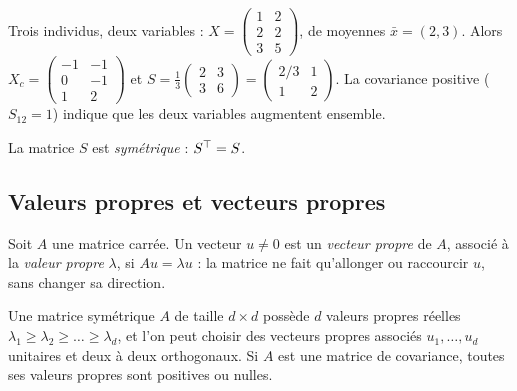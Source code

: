 \begin{exemple}
Trois individus, deux variables : $X=\begin{pmatrix}1&2\\2&2\\3&5\end{pmatrix}$, de moyennes $\bar x=(2,3)$.
Alors $X_c=\begin{pmatrix}-1&-1\\0&-1\\1&2\end{pmatrix}$ et
$S=\frac13\begin{pmatrix}2&3\\3&6\end{pmatrix}=\begin{pmatrix}2/3&1\\1&2\end{pmatrix}$.
La covariance positive ($S_{12}=1$) indique que les deux variables augmentent ensemble.
\end{exemple}

La matrice $S$ est \emph{symétrique} : $S^{\top}=S$.

\subsection{Valeurs propres et vecteurs propres}

\begin{definition}
Soit $A$ une matrice carrée. Un vecteur $u\ne0$ est un \emph{vecteur propre} de $A$, associé à la \emph{valeur propre} $\lambda$, si
$Au=\lambda u$ : la matrice ne fait qu'allonger ou raccourcir $u$, sans changer sa direction.
\end{definition}

\begin{theoreme}
\label{thm:spectral}
Une matrice symétrique $A$ de taille $d\times d$ possède $d$ valeurs propres réelles $\lambda_1\ge\lambda_2\ge\dots\ge\lambda_d$, et l'on peut choisir des vecteurs propres associés $u_1,\dots,u_d$ unitaires et deux à deux orthogonaux.
Si $A$ est une matrice de covariance, toutes ses valeurs propres sont positives ou nulles.
\end{theoreme}

